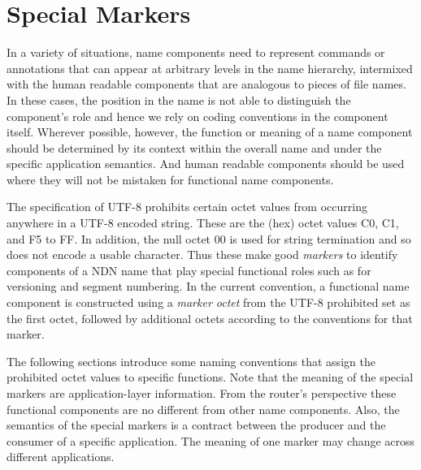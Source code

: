 \section{Special Markers}

In a variety of situations, name components need to represent commands or annotations that can appear at arbitrary levels in the name hierarchy, intermixed with the human readable components that are analogous to pieces of file names. In these cases, the position in the name is not able to distinguish the component’s role and hence we rely on coding conventions in the component itself. Wherever possible, however, the function or meaning of a name component should be determined by its context within the overall name and under the specific application semantics. And human readable components should be used where they will not be mistaken for functional name components.

The specification of UTF-8 prohibits certain octet values from occurring anywhere in a UTF-8 encoded string. These are the (hex) octet values C0, C1, and F5 to FF. In addition, the null octet 00 is used for string termination and so does not encode a usable character. Thus these make good \emph{markers} to identify components of a NDN name that play special functional roles such as for versioning and segment numbering. In the current convention, a functional name component is constructed using a \emph{marker octet} from the UTF-8 prohibited set as the first octet, followed by additional octets according to the conventions for that marker. 

The following sections introduce some naming conventions that assign the prohibited octet values to specific functions. Note that the meaning of the special markers are application-layer information. From the router's perspective these functional components are no different from other name components. Also, the semantics of the special markers is a contract between the producer and the consumer of a specific application. The meaning of one marker may change across different applications.



